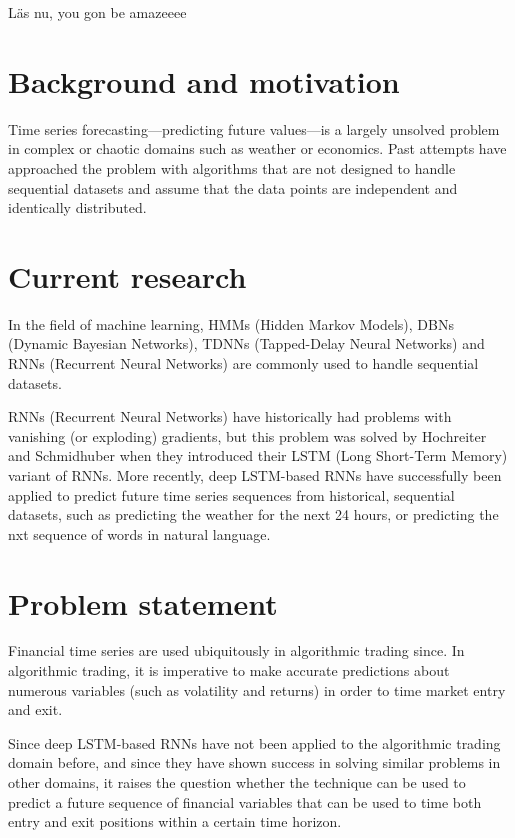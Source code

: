 Läs nu, you gon be amazeeee

\section{Background and motivation}
Time series forecasting---predicting future values---is a largely unsolved problem in complex or chaotic domains such as weather or economics. Past attempts have approached the problem with algorithms that are not designed to handle sequential datasets and assume that the data points are independent and identically distributed.

\section{Current research}
In the field of machine learning, HMMs (Hidden Markov Models), DBNs (Dynamic Bayesian Networks), TDNNs (Tapped-Delay Neural Networks) and RNNs (Recurrent Neural Networks) are commonly used to handle sequential datasets.

RNNs (Recurrent Neural Networks) have historically had problems with vanishing (or exploding) gradients, but this problem was solved by Hochreiter and Schmidhuber when they introduced their LSTM (Long Short-Term Memory) variant of RNNs.  More recently, deep LSTM-based RNNs have successfully been applied to predict future time series sequences from historical, sequential datasets, such as predicting the weather for the next 24 hours, or predicting the nxt sequence of words in natural language.

\section{Problem statement}
Financial time series are used ubiquitously in algorithmic trading since. In algorithmic trading, it is imperative to make accurate predictions about numerous variables (such as volatility and returns) in order to time market entry and exit.

Since deep LSTM-based RNNs have not been applied to the algorithmic trading domain before, and since they have shown success in solving similar problems in other domains, it raises the question whether the technique can be used to predict a future sequence of financial variables that can be used to time both entry and exit positions within a certain time horizon.
